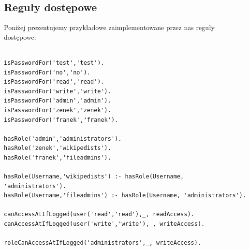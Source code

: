 \documentclass{classrep}
\begin{document}
\subsection{Reguły dostępowe}

Poniżej prezentujemy przykładowe zaimplementowane przez nas reguły dostępowe:
\begin{verbatim}

isPasswordFor('test','test').
isPasswordFor('no','no').
isPasswordFor('read','read').
isPasswordFor('write','write').
isPasswordFor('admin','admin').
isPasswordFor('zenek','zenek').
isPasswordFor('franek','franek').

hasRole('admin','administrators').
hasRole('zenek','wikipedists').
hasRole('franek','fileadmins').

hasRole(Username,'wikipedists') :- hasRole(Username, 'administrators').
hasRole(Username,'fileadmins') :- hasRole(Username, 'administrators').

canAccessAtIfLogged(user('read','read'),_, readAccess).
canAccessAtIfLogged(user('write','write'),_, writeAccess).

roleCanAccessAtIfLogged('administrators',_, writeAccess).
\end{verbatim}
\end{document}

